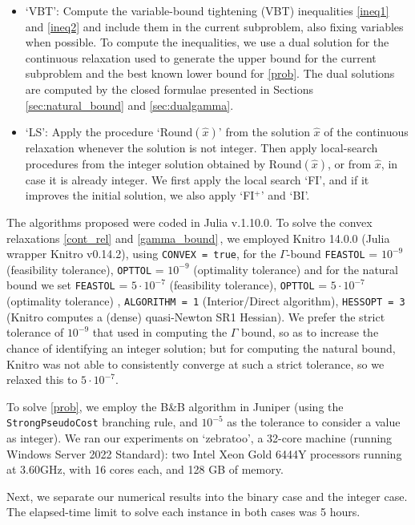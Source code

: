 \documentclass[smallextended]{svjour3hack}       %
\begin{document}
\begin{itemize}
    \item `VBT': Compute the variable-bound tightening (VBT) inequalities \eqref{ineq1} and \eqref{ineq2} and include them  in the current subproblem, also fixing variables when possible. To compute the inequalities, we use  a dual solution for the continuous relaxation used to generate the upper bound for the current subproblem  and the best known lower bound for \ref{prob}. The dual solutions are computed by   the closed formulae 
    presented in Sections \ref{sec:natural_bound} and \ref{sec:dualgamma}.
    \item `LS': Apply the procedure `Round$(\hat x)$' 
     from the solution $\hat x$ of the continuous relaxation whenever the solution is not integer. Then apply local-search procedures from the integer solution obtained by Round$(\hat x)$, or from $\hat{x}$, in case it is already integer.  We first apply the local search `FI', and if it improves the initial solution, we also apply `FI$^+$' and `BI'. 
\end{itemize}

The algorithms proposed were coded in Julia v.1.10.0. To solve the convex relaxations \ref{cont_rel} and \ref{gamma_bound}\,, we employed Knitro 14.0.0 (Julia wrapper Knitro v0.14.2),
using 
\texttt{CONVEX = true}, for
the $\Gamma$-bound  \texttt{FEASTOL} = $10^{-9}$ (feasibility tolerance),
\texttt{OPTTOL} = $10^{-9}$ (optimality tolerance)  and for the natural bound we set \texttt{FEASTOL} = $5\cdot 10^{-7}$ (feasibility tolerance),
\texttt{OPTTOL} = $5\cdot 10^{-7}$ (optimality tolerance) ,
\texttt{ALGORITHM = 1} (Interior/Direct algorithm), 
\texttt{HESSOPT = 3} (Knitro computes a (dense) quasi-Newton SR1 Hessian). 
We prefer the strict tolerance of $10^{-9}$ that used in computing the 
$\Gamma$ bound, so as to increase the chance of identifying an integer solution; but for computing the natural bound, 
Knitro was not able to consistently converge at such a strict tolerance, so we relaxed this to $5\cdot 10^{-7}$.

To solve \ref{prob}, we employ  the B\&B algorithm in  Juniper \cite{juniper} (using the \texttt{StrongPseudoCost} branching rule,    and $10^{-5}$ as the tolerance to consider a value as integer). 
We ran our experiments on `zebratoo', a
32-core machine (running Windows Server 2022 Standard):
two Intel Xeon Gold 6444Y processors running at 3.60GHz, with 16 cores each, and 128 GB of memory.

Next, we separate  our numerical results into the binary case and the integer case. The elapsed-time limit to solve each instance in both cases was 5 hours.
\end{document}
